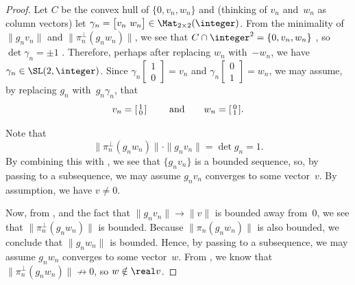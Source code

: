 \begin{proof}
Let $C$ be the convex hull of $\{0,v_n,w_n\}$ and
(thinking of $v_n$ and~$w_n$ as column vectors) let
$\gamma_n = \bigl[ v_n \  w_n \bigr] \in \Mat_{2\times 2}(\integer)$.
From the minimality of $\|g_n v_n\|$ and $\|
\pi_n^\perp(g_n w_n)\|$, we see that $C \cap \integer^2 =
\{0,v_n,w_n\}$ , so $\det \gamma_n =
\pm 1$ .
Therefore, perhaps after replacing $w_n$ with~$-w_n$, we
have $\gamma_n \in \SL(2,\integer)$. Since 
	$\gamma_n \! \left[ \begin{smallmatrix} 1 \\ 0 \end{smallmatrix} \right] = v_n$ 
and $\gamma_n \! \left[ \begin{smallmatrix} 0 \\ 1 \end{smallmatrix} \right] = w_n$, 
we may assume, by
replacing $g_n$ with~$g_n \gamma_n$, that 
 $$ \mbox{$v_n = \left[ \begin{smallmatrix} 1 \\ 0 \end{smallmatrix} \right]$
 \qquad and\qquad 
 $w_n = \left[ \begin{smallmatrix} 0 \\ 1 \end{smallmatrix} \right]$.} $$

Note that 
 \begin{equation} \label{det=gvxperp}
 \|\pi_n^\perp (g_n w_n)\| \cdot \|g_n v_n \|
 = \det g_n
 = 1 .
 \end{equation}
 By combining this with , we see that
$\{ g_n v_n\}$ is a bounded sequence, so, by passing to a
subsequence, we may assume $g_n v_n$ converges to some
vector~$v$. By assumption, we have $v \neq 0$.

Now, from , and the fact that $\|g_n v_n
\| \to \|v\|$ is bounded away from~$0$, we see that
$\|\pi_n^\perp (g_n w_n)\|$ is bounded. Because
$\|\pi_n(g_n w_n)\|$ is also bounded, we conclude that
$\|g_n w_n\|$ is bounded. Hence, by passing to a
subsequence, we may assume $g_n w_n$ converges to some
vector~$w$. From , we know that
$\|\pi_n^\perp(g_n w_n)\| \not\to 0$, so $w \notin \real
v$.


\end{proof}
